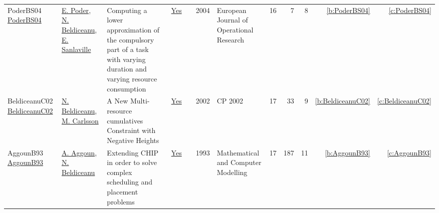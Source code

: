 {\begin{longtable}{>{\raggedright\arraybackslash}p{3cm}>{\raggedright\arraybackslash}p{6cm}>{\raggedright\arraybackslash}p{6.5cm}rrrp{2.5cm}rrrrr}
PoderBS04 \href{https://doi.org/10.1016/S0377-2217(02)00756-7}{PoderBS04} & \hyperref[auth:a364]{E. Poder}, \hyperref[auth:a129]{N. Beldiceanu}, \hyperref[auth:a722]{E. Sanlaville} & Computing a lower approximation of the compulsory part of a task with varying duration and varying resource consumption & \href{works/PoderBS04.pdf}{Yes} & \cite{PoderBS04} & 2004 & European Journal of Operational Research & 16 & 7 & 8 & \ref{b:PoderBS04} & \ref{c:PoderBS04}\\
BeldiceanuC02 \href{https://doi.org/10.1007/3-540-46135-3\_5}{BeldiceanuC02} & \hyperref[auth:a129]{N. Beldiceanu}, \hyperref[auth:a91]{M. Carlsson} & A New Multi-resource cumulatives Constraint with Negative Heights & \href{works/BeldiceanuC02.pdf}{Yes} & \cite{BeldiceanuC02} & 2002 & CP 2002 & 17 & 33 & 9 & \ref{b:BeldiceanuC02} & \ref{c:BeldiceanuC02}\\
AggounB93 \href{https://www.sciencedirect.com/science/article/pii/089571779390068A}{AggounB93} & \hyperref[auth:a734]{A. Aggoun}, \hyperref[auth:a129]{N. Beldiceanu} & Extending {CHIP} in order to solve complex scheduling and placement problems & \href{works/AggounB93.pdf}{Yes} & \cite{AggounB93} & 1993 & Mathematical and Computer Modelling & 17 & 187 & 11 & \ref{b:AggounB93} & \ref{c:AggounB93}\\
\end{longtable}
}

